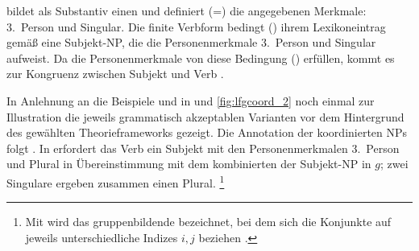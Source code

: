  bildet als Substantiv einen  und definiert (=) die
angegebenen Merk\-male: 3.~Person und Singular. Die finite Verbform 
bedingt (\req) ihrem Lexikoneintrag gemäß eine
Subjekt-NP, die die Personenmerkmale
3.~Person und Singular aufweist. Da die Personenmerkmale von  diese
Bedingung () erfüllen, kommt es zur Kongruenz
zwischen Subjekt und Verb \autocite[vgl.][59]{bresnanetal2016}.

In Anlehnung an die Beispiele  und  in
 und \ref{fig:lfgcoord_2} noch einmal zur Illustration
die jeweils grammatisch akzeptablen Varianten vor dem Hintergrund des gewählten
Theorieframeworks gezeigt. Die Annotation der koordinierten
NPs folgt \citet{peterson2004}. In 
erfordert das Verb  ein Subjekt mit den
Personenmerkmalen 3.~Person und Plural in Übereinstimmung
mit dem kombinierten  der Subjekt-NP in $g$; zwei
Singulare ergeben zusammen einen Plural.%
%
	\footnote{Mit  wird das gruppenbildende  bezeichnet, bei
		dem sich die Konjunkte auf jeweils unterschiedliche Indizes $i, j$
		beziehen \autocite[382--383]{dalrymple2001}.}

